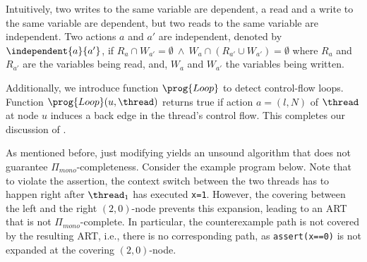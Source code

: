 \documentclass[conference]{IEEEtran}
\begin{document}
Intuitively, two writes to the same variable are dependent, a read and a
write to the same variable are dependent, but two reads to the same variable
are independent.  Two actions $a$ and $a'$ are independent, denoted
by $\independent{a}{a'}$,
if
%
$
        R_a \cap W_{a'} = \emptyset \
        \wedge\
        W_a \cap (R_{a'} \cup W_{a'}) = \emptyset
$
where $R_a$ and $R_{a'}$ are the variables being read,
and, $W_a$ and $W_{a'}$ the variables being written.

Additionally, we introduce function $\prog{Loop}$ to detect control-flow loops. 
Function $\prog{Loop}(u,\thread)$ returns true if action
$a=(l,N)$ of $\thread$ at node $u$ induces a back edge in the thread's control flow.
This completes our discussion of \prog{\dporexpand}.

As mentioned before, just modifying 
yields an unsound algorithm that does not guarantee $\Pi_{mono}$-completeness.
Consider the example program below. Note that to violate the assertion, the context
switch between the two threads has to happen right after $\thread_1$ has
executed \texttt{x=1}.  However, the covering between the
left and the right $(2,0)$-node prevents this expansion,
leading to an ART that is not $\Pi_{mono}$-complete.
In particular, the counterexample path is not
covered by the resulting ART, i.e., there is no
corresponding path, as \texttt{assert(x==0)} is not
expanded at the covering $(2,0)$-node.
\end{document}
